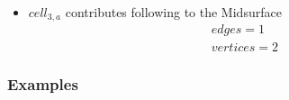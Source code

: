 \begin{itemize}
\item  $cell_{3,a}$ contributes following to the Midsurface
\vspace{-3mm}
\begin{equation}
\begin{aligned}
edges = 1\\
vertices = 2
\end{aligned}
\label{eqn_cellulara}
\end{equation}

\vspace{-3mm}

\end{itemize}
\subsubsection{Examples}
